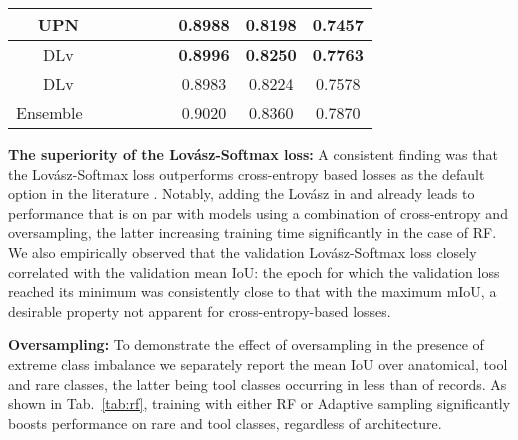 \documentclass[runningheads]{llncs}
\newcommand{\mc}[1]{\multicolumn{1}{c}{#1}}
\newcommand{\dvp}{DLv}
\newcommand{\upr}{UPN}
\newcommand{\lov}{Lov\'{a}sz}
\newcommand{\tbf}[1]{\textbf{#1}}
\newcommand{\tick}{\checkmark}
\newcommand{\ta}[1]{\textbf{}}
\begin{document}
\begin{table}[ht]
\begin{tabular}{c c c c c c c c c c}
    \mc{} & \upr                 & \mc{}        & \mc{}       & \mc{\tick} & \mc{}       & \mc{\tick} & \mc{0.8988} & \mc{0.8198} & \mc{0.7457} \\
    \midrule
    \mc{} & \dvp                 & \mc{}        & \mc{}       & \mc{\tick} & \mc{\tick}  & \mc{}      & \mc{\tbf{0.8996}} & \mc{\tbf{0.8250}} & \mc{\tbf{0.7763}} \\
    \mc{} & \dvp      & \mc{}        & \mc{}       & \mc{\tick} & \mc{\tick}  & \mc{}      & \mc{0.8983} & \mc{0.8224} & \mc{0.7578} \\
    \midrule
    \multicolumn{2}{c}{Ensemble}     & \mc{}        & \mc{}       & \mc{\tick} & \mc{\tick}  & \mc{}      & \mc{0.9020} & \mc{0.8360} & \mc{0.7870} \\

    \bottomrule
  \end{tabular}
\end{table}

\noindent\tbf{The superiority of the \lov{}-Softmax loss:}
A consistent finding was that the \lov{}-Softmax loss outperforms cross-entropy based losses as the default option in the literature \cite{Deeplabv3plus,OCR,UPerNet}. Notably, adding the \lov{} in \ta1 and \ta2 already leads to performance that is on par with models using a combination of cross-entropy and oversampling, the latter increasing training time significantly in the case of RF. We also empirically observed that the validation \lov{}-Softmax loss closely correlated with the validation mean IoU: the epoch for which the validation loss reached its minimum was consistently close to that with the maximum mIoU, a desirable property not apparent for cross-entropy-based losses.

\noindent\tbf{Oversampling:}
To demonstrate the effect of oversampling in the presence of extreme class imbalance we separately report the mean IoU over anatomical, tool and rare classes, the latter being tool classes occurring in less than  of records. As shown in Tab.~\ref{tab:rf}, training with either RF or Adaptive sampling significantly boosts performance on rare and tool classes, regardless of architecture.
\end{document}
